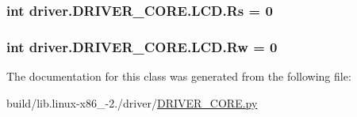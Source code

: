 \subsubsection[{Rs}]{\setlength{\rightskip}{0pt plus 5cm}int driver.\+D\+R\+I\+V\+E\+R\+\_\+\+C\+O\+R\+E.\+L\+C\+D.\+Rs = 0\hspace{0.3cm}{\ttfamily [static]}}\label{classdriver_1_1DRIVER__CORE_1_1LCD_a3b3638ad9241c610826a457a208db03e}
\hypertarget{classdriver_1_1DRIVER__CORE_1_1LCD_a3d390e26af88fa58f0a5a2071c2dadc4}{}
\subsubsection[{Rw}]{\setlength{\rightskip}{0pt plus 5cm}int driver.\+D\+R\+I\+V\+E\+R\+\_\+\+C\+O\+R\+E.\+L\+C\+D.\+Rw = 0\hspace{0.3cm}{\ttfamily [static]}}\label{classdriver_1_1DRIVER__CORE_1_1LCD_a3d390e26af88fa58f0a5a2071c2dadc4}


The documentation for this class was generated from the following file\+:\begin{DoxyCompactItemize}
\item 
build/lib.\+linux-\/x86\+\_-\/2./driver/\hyperlink{build_2lib_8linux-x86__64-2_87_2driver_2DRIVER__CORE_8py}{D\+R\+I\+V\+E\+R\+\_\+\+C\+O\+R\+E.\+py}\end{DoxyCompactItemize}

